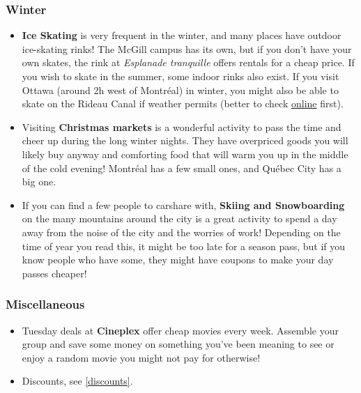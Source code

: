 \subsubsection{Winter}
    \begin{itemize}
            \item \textbf{Ice Skating} is very frequent in the winter, and many places have outdoor ice-skating rinks! The McGill campus has its own, but if you don't have your own skates, the rink at \textit{Esplanade tranquille} offers rentals for a cheap price. If you wish to skate in the summer, some indoor rinks also exist. If you visit Ottawa (around 2h west of Montréal) in winter, you might also be able to skate on the Rideau Canal if weather permits (better to check \href{https://ncc-ccn.gc.ca/places/rideau-canal-skateway}{online} first).
    \item Visiting \textbf{Christmas markets} is a wonderful activity to pass the time and cheer up during the long winter nights. They have overpriced goods you will likely buy anyway and comforting food that will warm you up in the middle of the cold evening! Montréal has a few small ones, and Québec City has a big one.
    \item If you can find a few people to carshare with, \textbf{Skiing and Snowboarding} on the many mountains around the city is a great activity to spend a day away from the noise of the city and the worries of work! Depending on the time of year you read this, it might be too late for a season pass, but if you know people who have some, they might have coupons to make your day passes cheaper!
    \end{itemize}

\subsubsection{Miscellaneous}
\begin{itemize}
    \item Tuesday deals at \textbf{Cineplex} offer cheap movies every week. Assemble your group and save some money on something you've been meaning to see or enjoy a random movie you might not pay for otherwise!
    
    \item  Discounts, see \hyperref[discounts]{\textcolor{purble}{\ref*{discounts}}}.
\end{itemize}

